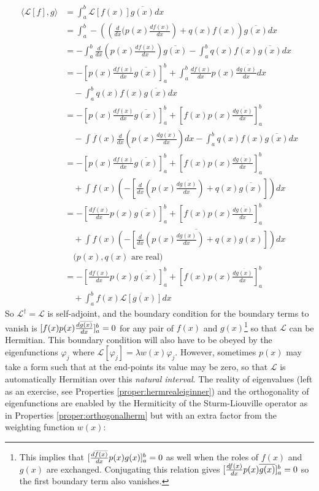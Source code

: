 \begin{align*}
\langle \mathcal{L}[f], g \rangle &= \int_a^b \mathcal{L}[f(x)] \overline{g(x)} dx \\
&= \int_a^b -\left(\left(\frac{d}{dx} (p(x) \frac{df(x)}{dx}\right) + q(x)f(x)\right)  \overline{g(x)} dx \\
&= -\int_a^b \frac{d}{dx} \left(p(x) \frac{d f(x)}{dx}\right) \overline{g(x)} - \int_a^b q(x)f(x)\overline{g(x)} dx \\
&= -\left[p(x) \frac{df(x)}{dx} \overline{g(x)}\right]_a^b + \int_a^b \frac{df(x)}{dx} p(x) \frac{d\overline{g(x)}}{dx} dx \\
&\quad - \int_a^b q(x)f(x)\overline{g(x)} dx\\
&= -\left[p(x) \frac{df(x)}{dx} \overline{g(x)}\right]_a^b + \left[f(x) p(x) \frac{d\overline{g(x)}}{dx}\right]_a^b  \\
&\quad -\int f(x)\frac{d}{dx}\left(p(x) \frac{d\overline{g(x)}}{dx}\right) dx - \int_a^b q(x)f(x)\overline{g(x)} dx \\
&= -\left[p(x) \frac{df(x)}{dx} \overline{g(x)}\right]_a^b + \left[f(x) p(x) \frac{d\overline{g(x)}}{dx}\right]_a^b  \\
&\quad + \int f(x) \left(-\left[\frac{d}{dx}\left(p(x) \frac{d\overline{g(x)}}{dx}\right) + q(x)\overline{g(x)}\right]\right) dx \\
&= -\left[\frac{df(x)}{dx} p(x) \overline{g(x)}\right]_a^b + \left[f(x) p(x) \frac{d\overline{g(x)}}{dx}\right]_a^b \\
&\quad + \int f(x) \overline{\left(-\left[\frac{d}{dx}\left(p(x) \frac{d g(x)}{dx}\right) + q(x)g(x)\right]\right)} dx \\
&\quad \text{($p(x), q(x)$ are real)} \\
&= -\left[\frac{df(x)}{dx} p(x) \overline{g(x)}\right]_a^b + \left[f(x) p(x) \frac{d\overline{g(x)}}{dx}\right]_a^b \\
&\quad + \int_a^b f(x) \overline{\mathcal{L}[g(x)]} dx
\end{align*}
So $\mathcal{L}^\dag = \mathcal{L}$ is self-adjoint, and the boundary condition for the boundary terms to vanish is $\smash{[f(x) p(x) \frac{d\overline{g(x)}}{dx}]_a^b} = 0$ for any pair of $f(x)$ and $g(x)$\footnote{This implies that $\smash{[\frac{d\overline{f(x)}}{dx} p(x) g(x)]_a^b} = 0$ as well when the roles of $f(x)$ and $g(x)$ are exchanged. Conjugating this relation gives $\smash{[\frac{df(x)}{dx} p(x) \overline{g(x)}]_a^b} = 0$ so the first boundary term also vanishes.} so that $\mathcal{L}$ can be Hermitian. This boundary condition will also have to be obeyed by the eigenfunctions $\varphi_j$ where $\mathcal{L}[\varphi_j] = \lambda w(x)\varphi_j$. However, sometimes $p(x)$ may take a form such that at the end-points its value may be zero, so that $\mathcal{L}$ is automatically Hermitian over this \textit{natural interval}. The reality of eigenvalues (left as an exercise, see Properties \ref{proper:hermrealeiginner}) and the orthogonality of eigenfunctions are enabled by the Hermiticity of the Sturm-Liouville operator as in Properties \ref{proper:orthogonalherm} but with an extra factor from the weighting function $w(x)$:
